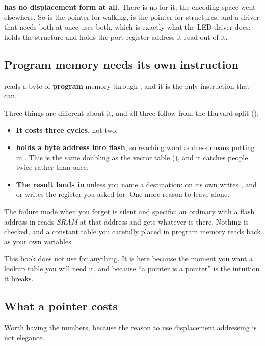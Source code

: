\textbf{ has no displacement form at all.} There is no  for it; the encoding space
went elsewhere. So  is the pointer for walking,  is the pointer for structures, and
a driver that needs both at once uses both, which is exactly what the LED driver does: 
holds the structure and  holds the port register address it read out of it.

\subsection{Program memory needs its own instruction}
\label{c4:sec:lpm}
 reads a byte of \textbf{program} memory through , and it is the only instruction
that can.

Three things are different about it, and all three follow from the Harvard split
():
\begin{itemize}
  \item \textbf{It costs three cycles}, not two.
  \item \textbf{ holds a byte address into flash}, so reaching word address 
    means putting  in . This is the same doubling as the vector table
    (), and it catches people twice rather than once.
  \item \textbf{The result lands in } unless you name a destination:  on its own
    writes , and  or  writes the register you asked for.
    One more reason to leave  alone.
\end{itemize}

The failure mode when you forget is silent and specific: an ordinary  with a flash address
in  reads \emph{SRAM} at that address and gets whatever is there. Nothing is checked, and a
constant table you carefully placed in program memory reads back as your own variables.

This book does not use  for anything. It is here because the moment you want a lookup
table you will need it, and because ``a pointer is a pointer'' is the intuition it breaks.

\subsection{What a pointer costs}
\label{c4:sec:cost}
Worth having the numbers, because the reason to use displacement addressing is not elegance.

